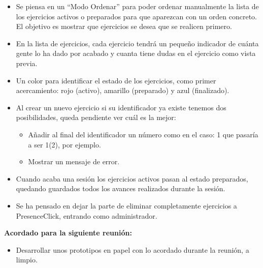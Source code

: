 \begin{itemize}
\item Se piensa en un “Modo Ordenar” para poder ordenar manualmente la lista de los ejercicios activos o preparados para que aparezcan con un orden concreto. El objetivo es mostrar que ejercicios se desea que se realicen primero.

\item En la lista de ejercicios, cada ejercicio tendrá un pequeño indicador de cuánta gente lo ha dado por acabado y cuanta tiene dudas en el ejercicio como vista previa.

\item Un color para identificar el estado de los ejercicios, como primer acercamiento: rojo (activo), amarillo (preparado) y azul (finalizado).

\item Al crear un nuevo ejercicio si su identificador ya existe tenemos dos posibilidades, queda pendiente ver cuál es la mejor:
\begin{itemize}
	\item Añadir al final del identificador un número como en el caso: 1 que pasaría a ser 1(2), por ejemplo.
	\item Mostrar un mensaje de error.
\end{itemize}

\item Cuando acaba una sesión los ejercicios activos pasan al estado preparados, quedando guardados todos los avances realizados durante la sesión.

\item Se ha pensado en dejar la parte de eliminar completamente ejercicios a PresenceClick, entrando como administrador.
\end{itemize}

\textbf{Acordado para la siguiente reunión:}

\begin{itemize}
\item Desarrollar unos prototipos en papel con lo acordado durante la reunión, a limpio.
\end{itemize}
